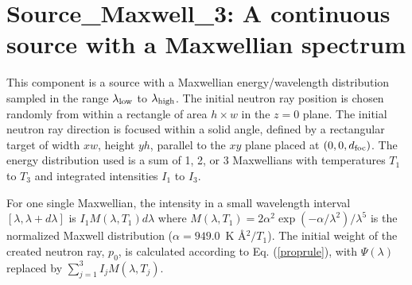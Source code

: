\section{Source\_Maxwell\_3: A continuous source
with a Maxwellian spectrum}
\label{source-maxwell}


This component is a source with a Maxwellian energy/wavelength distribution
sampled in the range $\lambda_{\rm low}$ to $\lambda_{\rm high}$.
The initial neutron ray position is chosen randomly from within a
rectangle of area $h \times w$ in the $z=0$ plane.
The initial neutron ray direction is focused within
a solid angle, defined by a rectangular target of width
$xw$, height $yh$, parallel to
the $xy$ plane placed at $(0,0,d_{\rm foc})$.
The energy distribution used is a sum of 1, 2, or 3 Maxwellians with
temperatures $T_1$ to $T_3$ and integrated intensities $I_1$ to $I_3$.

For one single Maxwellian,
the intensity in a small wavelength interval $[\lambda, \lambda+d\lambda]$ is
$ I_1 M(\lambda,T_1) d\lambda $
where
$M(\lambda,T_1) = 2 \alpha^2 \exp(-\alpha/\lambda^2) / \lambda^5 $
is the normalized Maxwell distribution ($\alpha=949.0$~K \AA$^2/T_1$).
The initial weight of the created neutron ray, $p_0$, is
calculated according to Eq. (\ref{proprule}), with $\Psi(\lambda)$ replaced
by $\sum_{j=1}^3 I_j M(\lambda,T_j)$.

%
%

